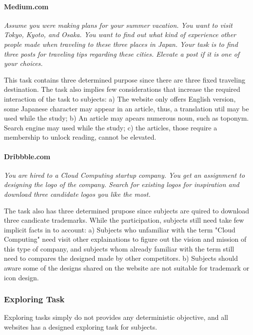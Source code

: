 \paragraph{Medium.com} \emph{Assume you were making plans for your summer vacation. 
        You want to visit Tokyo, Kyoto, and Osaka. You want to find out what kind of experience other people made 
        when traveling to these three places in Japan. Your task is to find three posts 
        for traveling tips regarding these cities. Elevate a post if it is one of your choices.}

This task contains three determined purpose since there are three fixed traveling destination.
The task also implies few considerations that increase the required interaction of the task to subjects:
a) The website only offers English version, some Japanese character may appear in an article,
thus, a translation util may be used while the study;
b) An article may apears numerous noun, such as toponym. Search engine may used while the study;
c) the articles, those require a membership to unlock reading, cannot be elevated. 


\paragraph{Dribbble.com} \emph{You are hired to a Cloud Computing startup company. You get an assignment to 
        designing the logo of the company. Search for existing logos for inspiration and 
        download three candidate logos you like the most.}

The task also has three determined prupose since subjects are quired to download three candicate trademarks.
While the participation, subjects still need take few implicit facts in to account:
a) Subjects who unfamiliar with the term "Cloud Computing" need visit other explainations to figure out
the vision and mission of this type of company, and subjects whom already familiar with the term
still need to compares the designed made by other competitors.
b) Subjects should aware some of the designs shared on the website are not suitable for trademark or icon design.

\subsubsection{Exploring Task}

Exploring tasks simply do not provides any deterministic objective,
and all websites has a designed exploring task for subjects.


